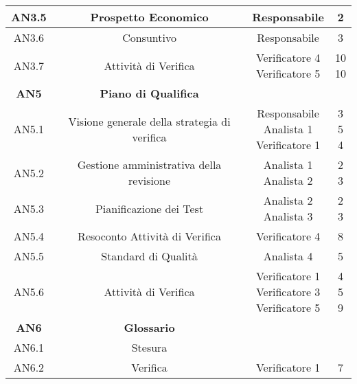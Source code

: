 \documentclass{scalatekids-article}
\begin{document}
\begin{center}
\begin{tabular}{| c | c | c | c |}
    \hline
    AN3.5 & Prospetto Economico & Responsabile & 2\\
    \hline
    AN3.6 & Consuntivo & Responsabile & 3\\
    \hline
    AN3.7 & Attività di Verifica & \multiLineCell[t]{Verificatore 4\\Verificatore 5} & \multiLineCell[t]{10\\10}\\
    \hline
    \textbf{AN5} & \textbf{Piano di Qualifica} & &\\
    \hline
    AN5.1 & Visione generale della strategia di verifica & \multiLineCell[t]{Responsabile\\Analista 1\\Verificatore 1} & \multiLineCell[t]{3\\5\\4}\\
    \hline
    AN5.2 & Gestione amministrativa della revisione & \multiLineCell[t]{Analista 1\\Analista 2} & \multiLineCell[t]{2\\3}\\
    \hline
    AN5.3 & Pianificazione dei Test & \multiLineCell[t]{Analista 2\\Analista 3} & \multiLineCell[t]{2\\3}\\
    \hline
    AN5.4 & Resoconto Attività di Verifica & Verificatore 4 & 8\\
    \hline
    AN5.5 & Standard di Qualità & Analista 4 & 5\\
    \hline
    AN5.6 & Attività di Verifica & \multiLineCell[t]{Verificatore 1\\Verificatore 3\\Verificatore 5} & \multiLineCell[t]{4\\5\\9}\\
    \hline
    \textbf{AN6} & \textbf{Glossario} & &\\
    \hline
    AN6.1 & Stesura & &\\
    \hline
    AN6.2 & Verifica & Verificatore 1 & 7
  \end{tabular}
\end{center}
\normalsize

\newpage
\end{document}
